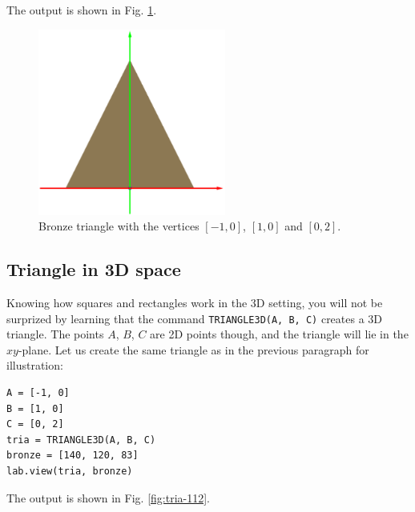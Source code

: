 \noindent
The output is shown in Fig. \ref{fig:tria-111}.

\begin{figure}[!ht]
\begin{center}
\includegraphics[width=0.55\textwidth]{img/tria-111.png}
\end{center}
\vspace{-4mm}
\caption{Bronze triangle with the vertices $[-1, 0]$, $[1, 0]$ and $[0, 2]$.}
\label{fig:tria-111}
\end{figure}
\noindent

\subsection{Triangle in 3D space}

Knowing how squares and rectangles work in the 3D setting, you will
not be surprized by learning that the command {\tt TRIANGLE3D(A, B, C)}
creates a 3D triangle. The points $A$, $B$, $C$ are 2D points though, 
and the triangle will lie in the $xy$-plane. Let us create the 
same triangle as in the previous paragraph for illustration:\\

\begin{bbox}
\begin{verbatim}
A = [-1, 0] 
B = [1, 0] 
C = [0, 2] 
tria = TRIANGLE3D(A, B, C)
bronze = [140, 120, 83]
lab.view(tria, bronze)
\end{verbatim}
\end{bbox}
\vspace{6mm}

\noindent
The output is shown in Fig. \ref{fig:tria-112}.

